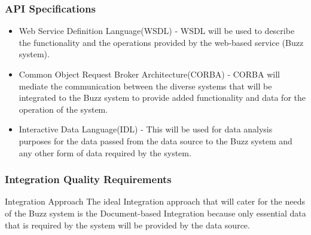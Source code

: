 \subsubsection{API Specifications}
\begin{itemize}
\item Web Service Definition Language(WSDL) - WSDL will be used to describe the functionality and the operations provided by the web-based service (Buzz system).
\item Common Object Request Broker Architecture(CORBA) - CORBA will mediate the communication between the diverse systems that will be integrated to the Buzz system to provide added functionality and data for the operation of the system.
\item Interactive Data Language(IDL) - This will be used for data analysis purposes for the data passed from the data source to the Buzz system and any other form of data required by the system.
\end{itemize}

\subsubsection{Integration Quality Requirements}


Integration Approach
The ideal Integration approach that will cater for the needs of the Buzz system is the Document-based Integration because only essential data that is required by the system will be provided by the data source.


